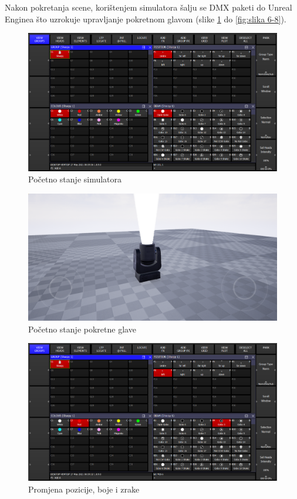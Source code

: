 \documentclass[times, utf8, zavrsni, numeric]{fer}
\begin{document}
Nakon pokretanja scene, korištenjem simulatora šalju se DMX paketi do Unreal Enginea što uzrokuje upravljanje pokretnom glavom (slike \ref{fig:slika 6-5} do \ref{fig:slika 6-8}).

\begin{figure}[htp]
	\centering
	\includegraphics[width=\linewidth]{slika 6-5.png}
	\caption{Početno stanje simulatora}
	\label{fig:slika 6-5}
\end{figure}

\begin{figure}[htp]
	\centering
	\includegraphics[width=\linewidth]{slika 6-6.png}
	\caption{Početno stanje pokretne glave}
	\label{fig:slika 6-6}
\end{figure}

\begin{figure}[htp]
	\centering
	\includegraphics[width=\linewidth]{slika 6-7.png}
	\caption{Promjena pozicije, boje i zrake}
	\label{fig:slika 6-7}
\end{figure}
\end{document}
